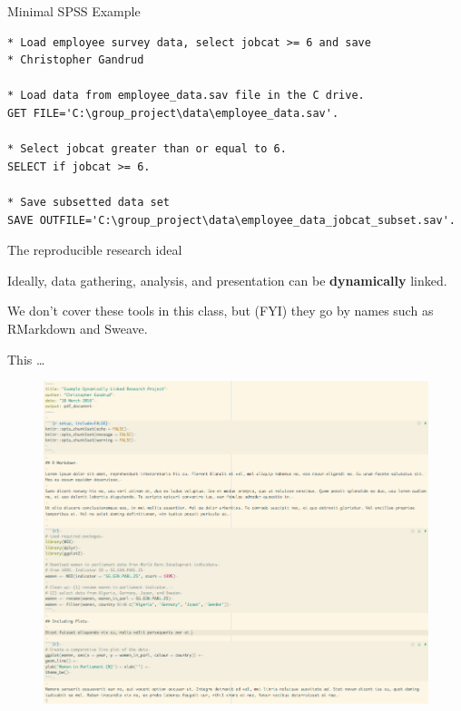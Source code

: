 \documentclass[10pt]{beamer}
\begin{document}
\begin{frame}[fragile]{Minimal SPSS Example}

\begin{lstlisting}
* Load employee survey data, select jobcat >= 6 and save
* Christopher Gandrud

* Load data from employee_data.sav file in the C drive.
GET FILE='C:\group_project\data\employee_data.sav'.

* Select jobcat greater than or equal to 6.
SELECT if jobcat >= 6.

* Save subsetted data set
SAVE OUTFILE='C:\group_project\data\employee_data_jobcat_subset.sav'.
\end{lstlisting}

\end{frame}


\begin{frame}{The reproducible research ideal}

    Ideally, data gathering, analysis, and presentation can be \textbf{dynamically} linked.

    \vspace{1cm}

    We don't cover these tools in this class, but (FYI) they go by names such as RMarkdown and Sweave.

\end{frame}

\begin{frame}{This \ldots}

    \begin{figure}
            \includegraphics[scale=0.3]{img/rmarkdown_source.png}
    \end{figure}

\end{frame}
\end{document}

